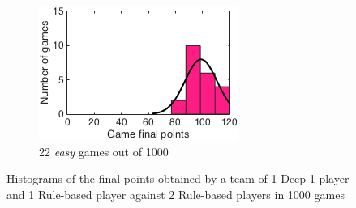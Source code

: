 \begin{figure}[h]
\begin{subfigure}[h]{0.32\textwidth}
                \includegraphics[width=\textwidth]{./img/appendix/histFeasy}
                \caption{22 \emph{easy} games out of 1000}
                \label{app:histFeasy}
        \end{subfigure}
        \caption[Histograms of the final points obtained in scenario (f) for \emph{hard}, \emph{medium} and \emph{easy} hands]{Histograms of the final points obtained by a team of 1 Deep-1 player and 1 Rule-based player against 2 Rule-based players in 1000 games}
        \label{app:histogramsF}
\end{figure}

